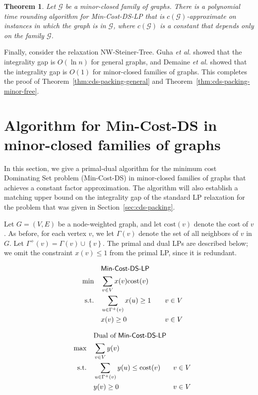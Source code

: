 \documentclass[11pt]{article}
\newtheorem{theorem}[lemma]{Theorem}
\def\etal{\emph{et al.}\xspace}
\def\script#1{\mathcal{#1}}
\def\set#1{\left\{#1\right\}}
\def\sG{\script{G}}
\def\prob#1{\textsf{\textup{#1}}\xspace}
\def\minDSlp{\prob{\minDS-LP}}
\def\nwST{\prob{NW-Steiner-Tree}}
\def\minDS{\prob{Min-Cost-DS}}
\def\cost{\mathrm{cost}}
\begin{document}
\begin{theorem} \label{thm:min-ds-planar-integrality-gap}
	Let $\sG$ be a minor-closed family of graphs. There is a
	polynomial time rounding algorithm for \minDSlp that is
	$c(\sG)$-approximate on instances in which the graph is in $\sG$,
	where $c(\sG)$ is a constant that depends only on the family
	$\sG$.
\end{theorem}

\noindent
Finally, consider the relaxation \nwST. Guha \etal \cite{GuhaMNS99}
showed that the integrality gap is $O(\ln{n})$ for general graphs,
and Demaine \etal \cite{DemaineHK09} showed that the integrality gap
is $O(1)$ for minor-closed families of graphs.  This completes the
proof of Theorem~\ref{thm:cds-packing-general} and
Theorem~\ref{thm:cds-packing-minor-free}.

\section{Algorithm for \minDS in minor-closed families of graphs}
\label{sec:min-cost-ds-planar}

In this section, we give a primal-dual algorithm for the minimum cost
\prob{Dominating Set} problem (\minDS) in minor-closed families of
graphs that achieves a constant factor approximation. The algorithm
will also establish a matching upper bound on the integrality gap of
the standard LP relaxation for the problem that was given in
Section~\ref{sec:cds-packing}.

Let $G = (V, E)$ be a node-weighted graph, and let $\cost(v)$ denote
the cost of $v$. As before, for each vertex $v$, we let $\Gamma(v)$
denote the set of all neighbors of $v$ in $G$. Let $\Gamma^+(v) =
\Gamma(v) \cup \set{v}$. The primal and dual LPs are described below;
we omit the constraint $x(v) \leq 1$ from the primal LP, since it is
redundant.

\begin{center}
\begin{boxedminipage}{0.45\textwidth}
\vspace{-0.15in}
\begin{align*}
	&  \minDSlp &\\
	\quad \min \quad & \sum_{v \in V} x(v) \cost(v) &\\
	\text{s.t.} \quad & \sum_{ u \in \Gamma^+(v)} x(u) \geq 1 \quad &
	v\in V\\
	& x(v) \geq 0 & v\in V
\end{align*}
\end{boxedminipage}
\vspace{0.1in}
\begin{boxedminipage}{0.45\textwidth}
\vspace{-0.15in}
\begin{align*}
	&  \text{Dual of } \minDSlp &\\
	\quad \max \quad & \sum_{v \in V} y(v)\\
	\text{s.t.} \quad & \sum_{u \in \Gamma^+(v)} y(u) \leq
	\cost(v) & v\in V\\
	& y(v) \geq 0 & v\in V
\end{align*}
\end{boxedminipage}
\end{center}
\end{document}
